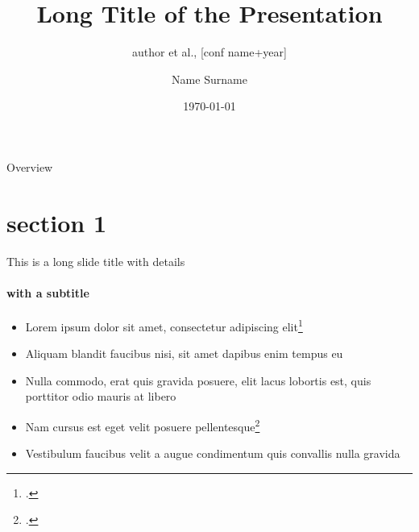 \documentclass[9pt,aspectratio=169,xcolor=dvipsnames, t]{beamer}
\title[short title]{Long Title of the Presentation}
\subtitle{author et al., [conf name+year]}
\author[Surname]{Name Surname}
\institute[lab]{Name of the lab and/or institution}
\date{\today} %
\begin{document}

\begin{frame}[plain]
    \maketitle
\end{frame}

\begin{frame}[plain]{Overview}
    \tableofcontents
\end{frame}

\section{section 1}
\begin{frame}[t]{This is a long slide title with details}
    \framesubtitle{with a subtitle}
    \begin{itemize}
        \item Lorem ipsum dolor sit amet, consectetur adipiscing elit\footcite{adamou2004}
        \item Aliquam blandit faucibus nisi, sit amet dapibus enim tempus eu
        \item Nulla commodo, erat quis gravida posuere, elit lacus lobortis est, quis porttitor odio mauris at libero
        \item Nam cursus est eget velit posuere pellentesque\footcite{kiefer2019}
        \item Vestibulum faucibus velit a augue condimentum quis convallis nulla gravida
    \end{itemize}
\end{frame}
\end{document}
